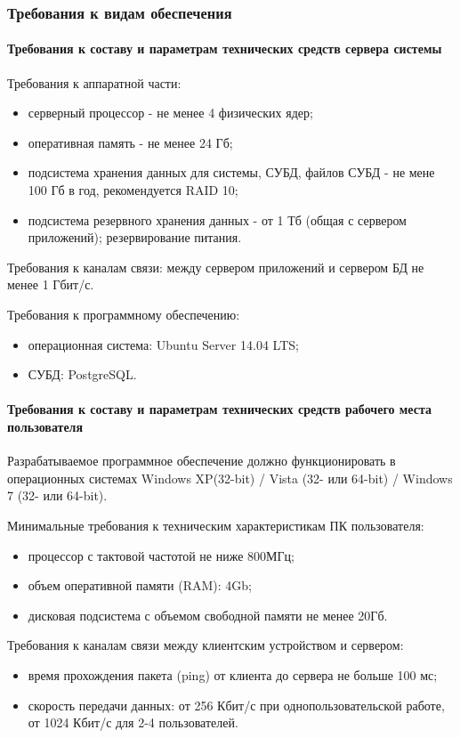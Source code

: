 \documentclass[a4paper]{extarticle}
\numberwithin{equation}{section}
\begin{document}
\subsubsection{Требования к видам обеспечения}

\paragraph{Требования к составу и параметрам технических средств сервера системы}
Требования к аппаратной части:\par
\begin{itemize}
  \item серверный процессор - не менее 4 физических ядер;
  \item оперативная память - не менее 24 Гб;
  \item подсистема хранения данных для системы, СУБД, файлов СУБД - не мене 100 Гб в год, рекомендуется RAID 10;
  \item подсистема резервного хранения данных - от 1 Тб (общая с сервером приложений); резервирование питания.
\end{itemize}\par
Требования к каналам связи: между сервером приложений и сервером БД не менее 1 Гбит/с.\par
Требования к программному обеспечению:\par
\begin{itemize}
  \item операционная система: Ubuntu Server 14.04 LTS;
  \item СУБД: PostgreSQL.
\end{itemize}\par

\paragraph{Требования к составу и параметрам технических средств рабочего места пользователя}
Разрабатываемое программное обеспечение должно функционировать в операционных системах Windows XP(32-bit) / Vista (32- или 64-bit) / Windows 7 (32- или 64-bit).\par
Минимальные требования к техническим характеристикам ПК пользователя:\par
\begin{itemize}
  \item процессор с тактовой частотой не ниже 800МГц;
  \item объем оперативной памяти (RAM): 4Gb;
  \item дисковая подсистема с объемом свободной памяти не менее 20Гб.
\end{itemize}\par
Требования к каналам связи между клиентским устройством и сервером:\par
\begin{itemize}
  \item время прохождения пакета (ping) от клиента до сервера не больше 100 мс;
  \item скорость передачи данных: от 256 Кбит/с при однопользовательской работе, от 1024 Кбит/с для 2-4 пользователей.
\end{itemize}
\end{document}
